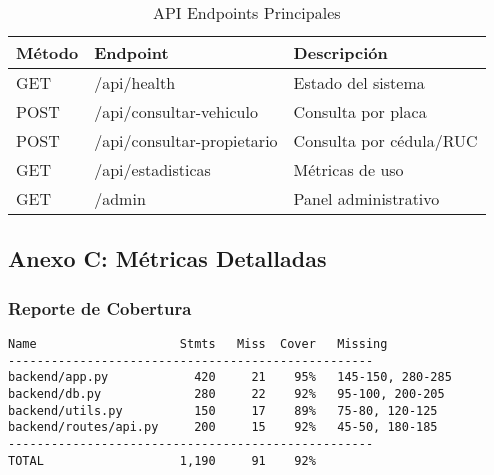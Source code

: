 \documentclass[12pt,a4paper]{article}
\begin{document}
\begin{table}[h]
\centering
\begin{tabularx}{\textwidth}{|l|l|X|}
\hline
\textbf{Método} & \textbf{Endpoint} & \textbf{Descripción} \\
\hline
GET & /api/health & Estado del sistema \\
\hline
POST & /api/consultar-vehiculo & Consulta por placa \\
\hline
POST & /api/consultar-propietario & Consulta por cédula/RUC \\
\hline
GET & /api/estadisticas & Métricas de uso \\
\hline
GET & /admin & Panel administrativo \\
\hline
\end{tabularx}
\caption{API Endpoints Principales}
\end{table}

\subsection{Anexo C: Métricas Detalladas}

\subsubsection{Reporte de Cobertura}

\begin{lstlisting}
Name                    Stmts   Miss  Cover   Missing
---------------------------------------------------
backend/app.py            420     21    95%   145-150, 280-285
backend/db.py             280     22    92%   95-100, 200-205
backend/utils.py          150     17    89%   75-80, 120-125
backend/routes/api.py     200     15    92%   45-50, 180-185
---------------------------------------------------
TOTAL                   1,190     91    92%
\end{lstlisting}

\vfill
\end{document}
